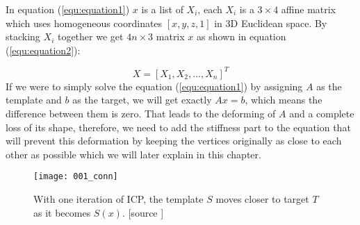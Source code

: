 \documentclass[../structure.tex]{subfiles}
\begin{document}
\hspace{2em}In equation (\ref{equ:equation1}) $x$ is a list of $X_i$, each $X_i$ is a $3\times4$ affine matrix which uses homogeneous coordinates $[x,y,z,1]$ in 3D Euclidean space. By stacking $X_i$ together we get $4n\times3$ matrix $x$ as shown in equation (\ref{equ:equation2}):

\begin{equation}
\label{equ:equation2}
X = [X_1, X_2, ... ,X_n]^T
\end{equation}
If we were to simply solve the equation (\ref{equ:equation1}) by assigning $A$ as the template and $b$ as the target, we will get exactly $Ax=b$, which means the difference between them is zero. That leads to the deforming of $A$ and a complete loss of its shape, therefore, we need to add the stiffness part to the equation that will prevent this deformation by keeping the vertices originally as close to each other as possible which we will later explain in this chapter.

\begin{figure}[t]
\centering
\texttt{[image: 001\_conn]}
\captionsetup{justification=centering}
\caption{With one iteration of ICP, the template $S$ moves closer to target $T$ as it becomes $S(x)$. [source \cite{Amberg2007}]}
\label{fig:figure1}
\end{figure}
\end{document}

